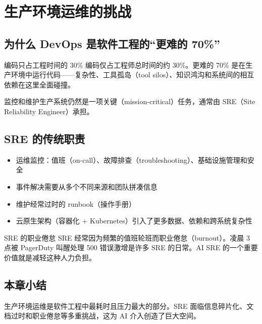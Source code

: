 \section{生产环境运维的挑战}

\subsection{为什么 DevOps 是软件工程的``更难的 70\%''}

\begin{importantbox}{编码只占工程时间的 30\%}
编码仅占工程师总时间的约 30\%。更难的 70\% 是在生产环境中运行代码——复杂性、工具孤岛（tool silos）、知识鸿沟和系统间的相互依赖在这里全面碰撞。
\end{importantbox}

监控和维护生产系统仍然是一项关键（mission-critical）任务，通常由 SRE（Site Reliability Engineer）承担。

\subsection{SRE 的传统职责}

\begin{itemize}
    \item 运维监控：值班（on-call）、故障排查（troubleshooting）、基础设施管理和安全
    \item 事件解决需要从多个不同来源和团队拼凑信息
    \item 维护经常过时的 runbook（操作手册）
    \item 云原生架构（容器化 + Kubernetes）引入了更多数据、依赖和跨系统复杂性
\end{itemize}

\begin{warningbox}{SRE 的职业倦怠}
SRE 经常因为频繁的值班轮班而职业倦怠（burnout）。凌晨 3 点被 PagerDuty 叫醒处理 500 错误激增是许多 SRE 的日常。AI SRE 的一个重要价值就是减轻这种人力负担。
\end{warningbox}

\subsection{本章小结}

生产环境运维是软件工程中最耗时且压力最大的部分。SRE 面临信息碎片化、文档过时和职业倦怠等多重挑战，这为 AI 介入创造了巨大空间。

